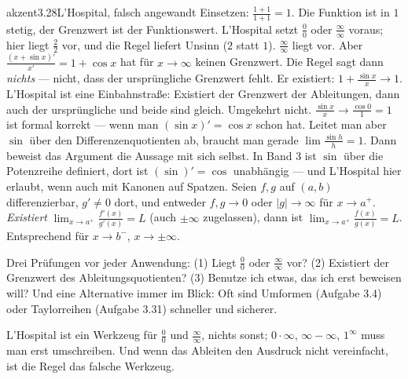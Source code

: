 \begin{loesungkarte}{akzent}{3.28}{L'Hospital, falsch angewandt}
Einsetzen: $\frac{1 + 1}{1 + 1} = 1$. Die Funktion ist in $1$ stetig, der Grenzwert ist der Funktionswert. L'Hospital setzt $\frac00$ oder $\frac\infty\infty$ voraus; hier liegt $\frac22$ vor, und die Regel liefert Unsinn ($2$ statt $1$).
$\frac\infty\infty$ liegt vor. Aber $\frac{(x + \sin x)'}{x'} = 1 + \cos x$ hat für $x\to\infty$ keinen Grenzwert. Die Regel sagt dann \emph{nichts} --- nicht, dass der ursprüngliche Grenzwert fehlt. Er existiert: $1 + \frac{\sin x}x\to1$. L'Hospital ist eine Einbahnstraße: Existiert der Grenzwert der Ableitungen, dann auch der ursprüngliche und beide sind gleich. Umgekehrt nicht.
$\frac{\sin x}x\to\frac{\cos0}1 = 1$ ist formal korrekt --- wenn man $(\sin x)' = \cos x$ schon hat. Leitet man aber $\sin$ über den Differenzenquotienten ab, braucht man gerade $\lim\frac{\sin h}h = 1$. Dann beweist das Argument die Aussage mit sich selbst. In Band 3 ist $\sin$ über die Potenzreihe definiert, dort ist $(\sin)' = \cos$ unabhängig --- und L'Hospital hier erlaubt, wenn auch mit Kanonen auf Spatzen.
Seien $f, g$ auf $(a, b)$ differenzierbar, $g'\neq0$ dort, und entweder $f, g\to0$ oder $|g|\to\infty$ für $x\to a^{+}$. \emph{Existiert} $\lim_{x\to a^{+}}\frac{f'(x)}{g'(x)} = L$ (auch $\pm\infty$ zugelassen), dann ist $\lim_{x\to a^{+}}\frac{f(x)}{g(x)} = L$. Entsprechend für $x\to b^{-}$, $x\to\pm\infty$.
\begin{fehler}\kastentext
Drei Prüfungen vor jeder Anwendung: (1) Liegt $\frac00$ oder $\frac\infty\infty$ vor? (2) Existiert der Grenzwert des Ableitungsquotienten? (3) Benutze ich etwas, das ich erst beweisen will? Und eine Alternative immer im Blick: Oft sind Umformen (Aufgabe 3.4) oder Taylorreihen (Aufgabe 3.31) schneller und sicherer.
\end{fehler}
\begin{mitnehmen}\kastentext
L'Hospital ist ein Werkzeug für $\frac00$ und $\frac\infty\infty$, nichts sonst; $0\cdot\infty$, $\infty - \infty$, $1^{\infty}$ muss man erst umschreiben. Und wenn das Ableiten den Ausdruck nicht vereinfacht, ist die Regel das falsche Werkzeug.
\end{mitnehmen}
\end{loesungkarte}

